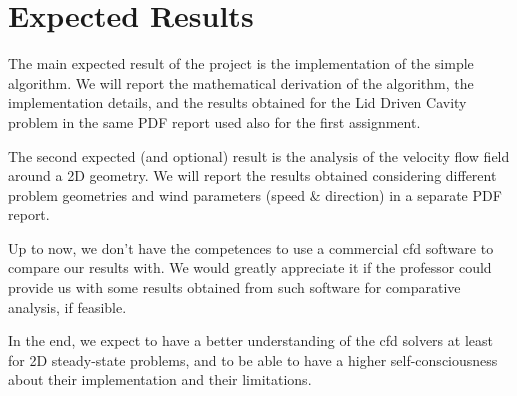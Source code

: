 \section{Expected Results}

The main expected result of the project is the implementation of the \acrshort{simple} algorithm.
We will report the mathematical derivation of the algorithm, the implementation details, and the results obtained for the Lid Driven Cavity problem in the same PDF report used also for the first assignment.

The second expected (and optional) result is the analysis of the velocity flow field around a 2D geometry.
We will report the results obtained considering different problem geometries and wind parameters (speed \& direction) in a separate PDF report.

Up to now, we don't have the competences to use a commercial \acrshort{cfd} software to compare our results with.
We would greatly appreciate it if the professor could provide us with some results obtained from such software for comparative analysis, if feasible.

In the end, we expect to have a better understanding of the \acrshort{cfd} solvers at least for 2D steady-state problems, and to be able to have a higher self-consciousness about their implementation and their limitations.